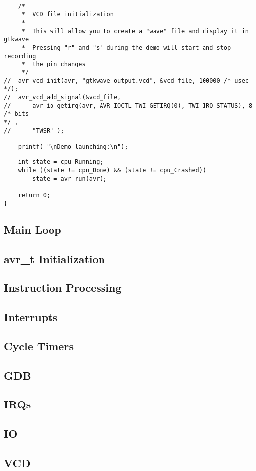 \begin{lstlisting}

    /*
     *  VCD file initialization
     *
     *  This will allow you to create a "wave" file and display it in gtkwave
     *  Pressing "r" and "s" during the demo will start and stop recording
     *  the pin changes
     */
//  avr_vcd_init(avr, "gtkwave_output.vcd", &vcd_file, 100000 /* usec */);
//  avr_vcd_add_signal(&vcd_file,
//      avr_io_getirq(avr, AVR_IOCTL_TWI_GETIRQ(0), TWI_IRQ_STATUS), 8 /* bits
*/ ,
//      "TWSR" );

    printf( "\nDemo launching:\n");
\end{lstlisting}



\begin{lstlisting}
    int state = cpu_Running;
    while ((state != cpu_Done) && (state != cpu_Crashed))
        state = avr_run(avr);

    return 0;
}
\end{lstlisting}


\subsection{Main Loop}
\subsection{avr\_t Initialization}
\subsection{Instruction Processing}
\subsection{Interrupts}
\subsection{Cycle Timers}
\subsection{GDB}
\subsection{IRQs}
\subsection{IO}
\subsection{VCD}
